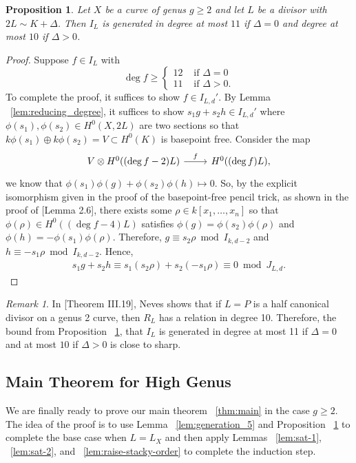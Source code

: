 \documentclass{amsart}
\theoremstyle{plain}
\newtheorem{prop}[thm]{Proposition}
\theoremstyle{definition}
\theoremstyle{remark}
\newtheorem{rem}[thm]{Remark}
\numberwithin{equation}{section}
\newcommand\ssec{\subsection}
\begin{document}
\begin{prop}
\label{prop:relation_11}
Let $X$ be a curve of genus $g \geq 2$ and let $L$ be a divisor with $2L \sim K + \Delta$. Then $I_L$ is generated in degree at most $11$ if $\Delta = 0$ and degree at most $10$ if $\Delta > 0$.
\end{prop}
\begin{proof}
Suppose $f \in I_L$ with 
$$
\deg f \geq \begin{cases}
	12 &\text{ if }\Delta = 0\\
	11 &\text{ if }\Delta > 0.
\end{cases}$$
To complete the proof, it suffices to show $f \in I_{L,d}'$. By Lemma ~\ref{lem:reducing_degree}, it suffices to show $s_1g+s_2h \in I_{L,d}'$ where $\phi(s_1),\phi(s_2) \in H^0(X,2L)$ are two sections so that $k\phi(s_1) \oplus k \phi(s_2) = V \subset H^0(K)$ is basepoint free. Consider the map
$$\begin{tikzcd}
V \otimes H^0((\deg f - 2)L) \ar {r}{f} & H^0((\deg f)L),
\end{tikzcd}$$
we know that $\phi(s_1)\phi(g) + \phi(s_2) \phi(h) \mapsto 0.$
So, by the explicit isomorphism given in the proof of the basepoint-free pencil trick, as shown in the proof of \cite{saint-donat:proj}[Lemma 2.6], there exists some $\rho \in k[x_1, \ldots, x_n]$ so that $\phi(\rho) \in H^0((\deg f - 4)L)$ satisfies $\phi(g) = \phi(s_2)\phi(\rho)$ and $\phi(h) = -\phi(s_1)\phi(\rho).$ Therefore, $g \equiv s_2 \rho \bmod I_{k,d-2}$ and $h \equiv -s_1 \rho \bmod I_{k,d-2}$. Hence,
\begin{align*}
	s_1g + s_2h \equiv s_1(s_2\rho) + s_2(-s_1 \rho) \equiv 0 \bmod J_{L,d}.
\end{align*}
\end{proof}

\begin{rem}
\label{rem:relations_generation_ten}
In \cite{neves:halfcan}[Theorem III.19], Neves shows that if $L=P$ is a half canonical divisor on a genus 2 curve, then $R_L$ has a relation in degree 10. Therefore, the bound from Proposition ~\ref{prop:relation_11}, that $I_L$ is generated in degree at most 11 if $\Delta = 0$ and at most $10$ if $\Delta > 0$ is close to sharp.
\end{rem}



\ssec{Main Theorem for High Genus}
\label{ssec:g-high-main}

We are finally ready to prove our main theorem ~\ref{thm:main} in the case $g \geq 2$. The idea of the proof is to use Lemma ~\ref{lem:generation_5} and Proposition ~\ref{prop:relation_11} to complete the base case when $L = L_X$ and then apply Lemmas ~\ref{lem:sat-1}, ~\ref{lem:sat-2}, and ~\ref{lem:raise-stacky-order} to complete the induction step.
\end{document}
